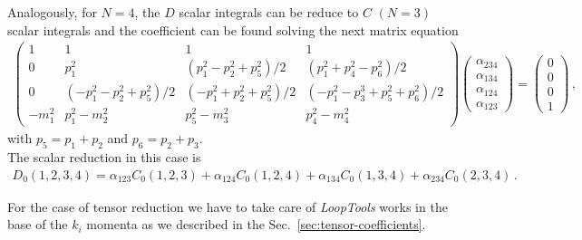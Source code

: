 Analogously, for $N=4$, the $D$ scalar integrals can be reduce to $C$ $(N=3)$ scalar integrals and the coefficient can be found solving the next matrix equation
\begin{align}
\begin{pmatrix}
1 & 1 & 1 & 1 \\
0 & p_1^2 & (p_1^2-p_2^2+p_5^2)/2  & (p_1^2+p_4^2-p_6^2)/2\\
0 & (-p_1^2-p_2^2+p_5^2)/2 & (-p_1^2+p_2^2+p_5^2)/2  & (-p_1^2-p_3^3+p_5^2+p_6^2)/2\\
 -m_1^2 & p_1^2-m_2^2 & p_5^2-m_3^2 & p_4^2-m_4^2
\end{pmatrix}
\begin{pmatrix}
\alpha_{234} \\ \alpha_{134} \\ \alpha_{124} \\ \alpha_{123}
\end{pmatrix}=
\begin{pmatrix}
0 \\ 0 \\ 0 \\ 1
\end{pmatrix}\,,
\end{align}
%
with $p_5=p_1+p_2$ and $p_6=p_2+p_3$.\\
The scalar reduction in this case is
\begin{align}
D_0(1,2,3,4)= \alpha_{123}C_0(1,2,3)+\alpha_{124}C_0(1,2,4)+\alpha_{134}C_0(1,3,4)+\alpha_{234}C_0(2,3,4)\,.
\end{align}

For the case of tensor reduction we have to take care of \textit{LoopTools} works in the base of the $k_i$ momenta as we described in the Sec.~\ref{sec:tensor-coefficients}. 


